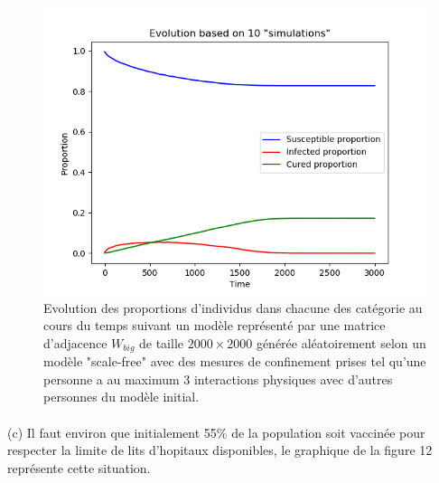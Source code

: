 \documentclass[a4paper, 12pt, oneside]{article}
\begin{document}
\begin{figure}[H]
	\centering
	\includegraphics[scale=1]{Wbig_dense_containment_comparaison.png} 
	\caption{Evolution des proportions d'individus dans chacune des catégorie au cours du temps suivant un modèle représenté par une matrice d'adjacence $W_{big}$ de taille $2000 \times 2000$ générée aléatoirement selon un modèle "scale-free" avec des mesures de confinement prises tel qu'une personne a au maximum 3 interactions physiques avec d'autres personnes du modèle initial.}
\end{figure}

\paragraph{}(c) Il faut environ que initialement 55\% de la population soit vaccinée pour respecter la limite de lits d'hopitaux disponibles, le graphique de la figure 12 représente cette situation.
\end{document}
